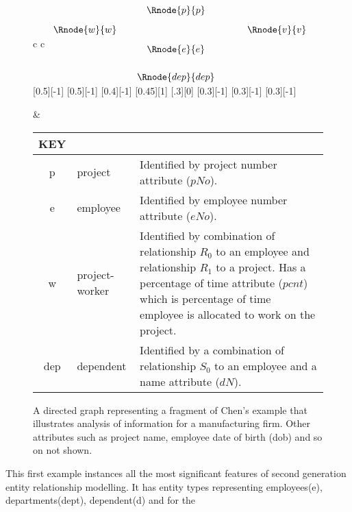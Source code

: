 \documentclass[10pt,a4paper]{article}
\begin{document}
\begin{figure} [H]  %
\begin{center}
\begin{tabular}{c c}
$
\begin{array}{c p{0.05cm}c p{0.5cm}c}
                        & & \Rnode{p}{p}& &             \\ [0.3cm]
	 \Rnode{w}{w}	& &                   & & \Rnode{v}{v} \\ [0.3cm]     
	                      & & \Rnode{e}{e}      & &             \\ [0.6cm]     
	                      & & \Rnode{dep}{dep}  & &             
\end{array}
$
[0.5][-1]
\idcomp
{} 
[0.5][-1]
\idcomp
{} 
\idcomp
{}
[0.4][-1]
\idcomp
{}
[0.45][1]
\idcomp
{}
[.3][0]
[0.3][-1]
\idcomp
{}
[0.3][-1]
[0.3][-1]

& \footnotesize
\begin{tabular}{c p{1.5cm} p{4cm}}
KEY && \\
\hline
p & project & Identified by project number attribute ($pNo$).\\
e & employee & Identified by employee number attribute ($eNo$). \\
w  & project-worker & Identified by combination of relationship $R_0$ to an employee and relationship $R_1$ to a project. Has a percentage of time attribute ($pcnt$) which is percentage of time employee is allocated to work on the project.\\
dep & dependent & Identified by a combination of relationship $S_0$ to an employee and a name attribute ($dN$).\\
\end{tabular} 
\end{tabular}
\end{center}
\caption{A directed graph representing a fragment of Chen's example that illustrates analysis of information for a manufacturing firm. Other attributes such as project name, employee date of birth (dob) and so on not shown.}
\label{chenfragment}
\end{figure}

\noindent
This first example instances all the most significant features of second generation entity relationship modelling. It has entity types representing employees(e), departments(dept), dependent(d)  and
for the  
\end{document}
